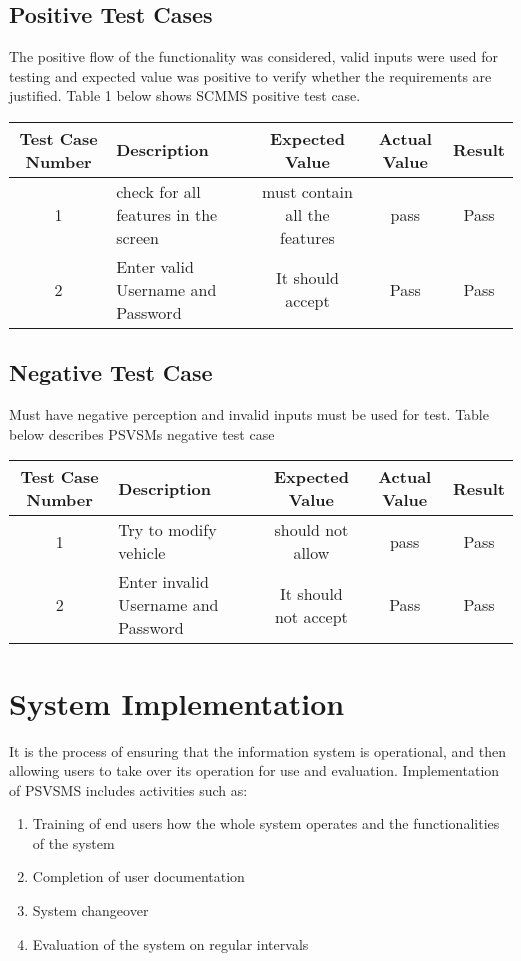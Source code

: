 \documentclass[a4paper, 12pt]{report}
\begin{document}
\subsection{Positive Test Cases}
The positive flow of the functionality was considered, valid inputs were used for testing and expected value was positive to verify whether the requirements are justified. Table 1 below shows SCMMS positive test case.
\begin{center}
\begin{tabular}{|c|p{3cm}|c|c|c|}
\hline
Test Case Number & Description & Expected Value & Actual Value & Result \\
\hline
1 & check for all features in the screen& must contain all the features & pass & Pass \\
2 & Enter valid Username and Password& It should accept & Pass & Pass \\

\hline
\end{tabular}
\end{center}
\par
\clearpage
\subsection{Negative Test Case}
\noindent Must have negative perception and invalid inputs must be used for test.
Table  below describes PSVSMs negative test case\par
\begin{center}
\begin{tabular}{|c|p{3cm}|c|c|c|}
\hline
Test Case Number & Description & Expected Value & Actual Value & Result \\
\hline
1 & Try to modify vehicle& should not allow & pass & Pass \\
2 & Enter invalid Username and Password& It should not accept & Pass & Pass \\

\hline
\end{tabular}
\end{center}

\section{System Implementation}

It is the process of ensuring that the information system is operational, and then allowing users to take over its operation for use and evaluation. Implementation of PSVSMS includes activities such as:

\begin{enumerate}
    \item Training of end users how the whole system operates and the functionalities of the system
    \item Completion of user documentation
    \item System changeover
    \item Evaluation of the system on regular intervals
\end{enumerate}
\end{document}
